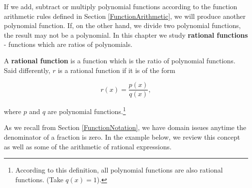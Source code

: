
\setcounter{footnote}{0}

\label{IntroRational}

If we add, subtract or multiply polynomial functions according to the function arithmetic rules defined in Section \ref{FunctionArithmetic}, we will produce another polynomial function. If, on the other hand, we divide two polynomial functions, the result may not be a polynomial.  In this chapter we study  \textbf{rational functions} - functions which are ratios of polynomials.

\smallskip

\colorbox{ResultColor}{\bbm

\begin{defn}  \label{rationalfunction} A \textbf{rational function} is a function which is the ratio of polynomial functions.  Said differently, $r$ is a rational function if it is of the form 

\[ r(x) = \dfrac{p(x)}{q(x)},\]

where $p$ and $q$ are polynomial functions.\footnote{According to this definition, all polynomial functions are also  rational functions. (Take $q(x) = 1$).}

\end{defn}

\ebm}

\smallskip

As we recall from Section \ref{FunctionNotation}, we have domain issues anytime the denominator of a fraction is zero.  In the example below, we review this concept as well as some of the arithmetic of rational expressions.

